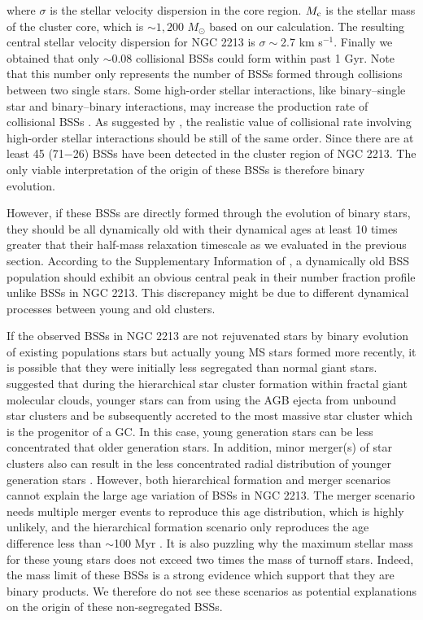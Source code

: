 \documentclass[useAMS,usenatbib,twocolumn]{mnras}
\begin{document}
where $\sigma$ is the stellar velocity dispersion in the core region. $M_{\rm c}$ is the stellar mass of the cluster core, which is $\sim1,200$ $M_{\odot}$ based on our calculation. The resulting central stellar velocity dispersion for NGC 2213 is $\sigma\sim$2.7 km s$^{-1}$. Finally we obtained that only $\sim$0.08 collisional BSSs could form within past 1 Gyr. Note that this number only represents the number of BSSs formed through collisions between two single stars. Some high-order stellar interactions, like binary--single star and binary--binary interactions, may increase the production rate of collisional BSSs \citep[see e.g.,][]{2013MNRAS.428..897L}. As suggested by \cite{Davi04a}, the realistic value of collisional rate involving high-order stellar interactions should be still of the same order. Since there are at least 45 (71$-$26) BSSs have been detected in the cluster region of NGC 2213. The only viable interpretation of the origin of these BSSs is therefore binary evolution. 

However, if these BSSs are directly formed through the evolution of binary stars, they should be all dynamically old with their dynamical ages at least 10 times greater that their half-mass relaxation timescale as we evaluated in the previous section. According to the Supplementary Information of \citet{Ferr12a}, a dynamically old BSS population should exhibit an obvious central peak in their number fraction profile unlike BSSs in NGC 2213. This discrepancy might be due to different dynamical processes between young and old clusters. 

If the observed BSSs in NGC 2213 are not rejuvenated stars by binary evolution of existing populations stars but actually young MS stars formed more recently, 
it is possible that they were initially less segregated than normal giant stars. 
\citet{Bekk17a} suggested that during the hierarchical star cluster formation within fractal giant molecular clouds, younger stars can from using the AGB ejecta from unbound star clusters and be subsequently accreted to the most massive star cluster which is the progenitor of a GC.
In this case, young generation stars can be less concentrated that older generation stars.
In addition, minor merger(s) of star clusters also can result in the less concentrated radial distribution of younger generation stars \citep[e.g.,][]{Hong17a}. 
However, both hierarchical formation and merger scenarios cannot explain the large age variation of BSSs in NGC 2213. The merger scenario \citep[e.g.,][]{Hong17a} needs multiple merger events to reproduce this age distribution, which is highly unlikely, and the hierarchical formation scenario only reproduces the age difference less than $\sim$100 Myr \citep[see also the section 2.6 in][]{Bekk17a}. It is also puzzling why the maximum stellar mass for these young stars does not exceed two times the mass of turnoff stars. Indeed, the mass limit of these BSSs is a strong evidence which support that they are binary products. We therefore do not see these scenarios as potential explanations on the origin of these non-segregated BSSs.
\end{document}
